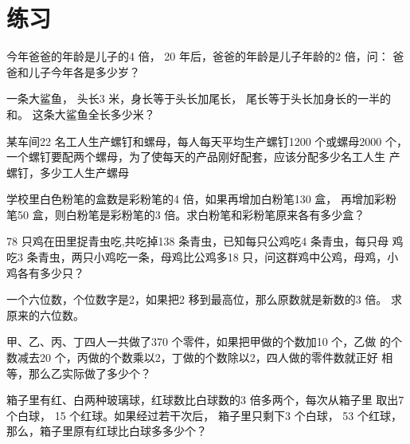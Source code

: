 \section{练习}
\begin{exercise}
    今年爸爸的年龄是儿子的4 倍， 20 年后，爸爸的年龄是儿子年龄的2 倍，问：
爸爸和儿子今年各是多少岁？
\end{exercise}
\vspace{3cm}
\begin{exercise}
  一条大鲨鱼， 头长3 米，身长等于头长加尾长， 尾长等于头长加身长的一半的和。
这条大鲨鱼全长多少米？
\end{exercise}
\vspace{3cm}
\begin{exercise}
    某车间22 名工人生产螺钉和螺母，每人每天平均生产螺钉1200 个或螺母2000
个，一个螺钉要配两个螺母，为了使每天的产品刚好配套，应该分配多少名工人生
产螺钉，多少工人生产螺母
\end{exercise}
\vspace{2cm}
\begin{exercise}
    学校里白色粉笔的盒数是彩粉笔的4 倍，如果再增加白粉笔130 盒， 再增加彩粉
笔50 盒，则白粉笔是彩粉笔的3 倍。求白粉笔和彩粉笔原来各有多少盒？
\end{exercise}
\vspace{3cm}
\begin{exercise}
   78 只鸡在田里捉青虫吃,共吃掉138 条青虫，已知每只公鸡吃4 条青虫，每只母
鸡吃3 条青虫，两只小鸡吃一条，母鸡比公鸡多18 只，问这群鸡中公鸡，母鸡，小
鸡各有多少只？
\end{exercise}
\vspace{3cm}
\begin{exercise}
    一个六位数，个位数字是2，如果把2 移到最高位，那么原数就是新数的3 倍。
求原来的六位数。
 \end{exercise}
 \vspace{3cm}
 \begin{exercise}
    甲、乙、丙、丁四人一共做了370 个零件，如果把甲做的个数加10 个，乙做
的个数减去20 个，丙做的个数乘以2，丁做的个数除以2，四人做的零件数就正好
相等，那么乙实际做了多少个？
 \end{exercise}
 \vspace{3cm}
 \begin{exercise}
    箱子里有红、白两种玻璃球，红球数比白球数的3 倍多两个，每次从箱子里
取出7 个白球， 15 个红球。如果经过若干次后， 箱子里只剩下3 个白球， 53 个红球，
那么，箱子里原有红球比白球多多少个？
 \end{exercise}
 \vspace{3cm}